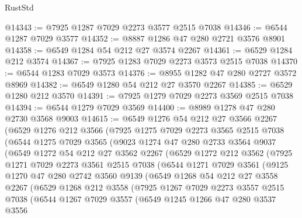 \begin{lexlean}{RustStd}
\begin{coremodule}
@14343 := @7925 @1287 @7029 @2273 @3577 @2515 @7038
@14346 := @6544 @1287 @7029 @3577
@14352 := @8887 @1286 @47 @280 @2721 @3576 @8901
@14358 := @6549 @1284 @54 @212 @27 @3574 @2267
@14361 := @6529 @1284 @212 @3574
@14367 := @7925 @1283 @7029 @2273 @3573 @2515 @7038
@14370 := @6544 @1283 @7029 @3573
@14376 := @8955 @1282 @47 @280 @2727 @3572 @8969
@14382 := @6549 @1280 @54 @212 @27 @3570 @2267
@14385 := @6529 @1280 @212 @3570
@14391 := @7925 @1279 @7029 @2273 @3569 @2515 @7038
@14394 := @6544 @1279 @7029 @3569
@14400 := @8989 @1278 @47 @280 @2730 @3568 @9003
@14615 := @6549
    @1276
    @54
    @212
    @27
    @3566
    @2267
    (@6529
      @1276
      @212
      @3566
      (@7925
        @1275
        @7029
        @2273
        @3565
        @2515
        @7038
        (@6544
          @1275
          @7029
          @3565
          (@9023
            @1274
            @47
            @280
            @2733
            @3564
            @9037
            (@6549
              @1272
              @54
              @212
              @27
              @3562
              @2267
              (@6529
                @1272
                @212
                @3562
                (@7925
                  @1271
                  @7029
                  @2273
                  @3561
                  @2515
                  @7038
                  (@6544
                    @1271
                    @7029
                    @3561
                    (@9125
                      @1270
                      @47
                      @280
                      @2742
                      @3560
                      @9139
                      (@6549
                        @1268
                        @54
                        @212
                        @27
                        @3558
                        @2267
                        (@6529
                          @1268
                          @212
                          @3558
                          (@7925
                            @1267
                            @7029
                            @2273
                            @3557
                            @2515
                            @7038
                            (@6544
                              @1267
                              @7029
                              @3557
                              (@6549
                                @1245
                                @1266
                                @47
                                @280
                                @3537
                                @3556

\end{coremodule}
\end{lexlean}
